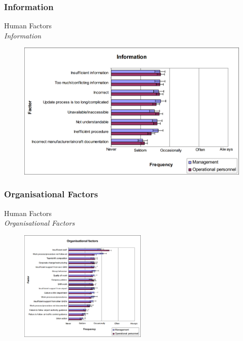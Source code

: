 \subsubsection{Information}
\begin{frame}{Human Factors\\\textit{Information}}{}
	\begin{figure}[H]
	\centering
	\includegraphics[width=\textwidth]{Grafik/Information}
\end{figure}
\end{frame}

\subsubsection{Organisational Factors}
\begin{frame}{Human Factors\\\textit{Organisational Factors}}{}
	\begin{figure}[H]
	\centering
	\includegraphics[width=230px]{Grafik/OrganisationalFactors}
\end{figure}
\end{frame}
